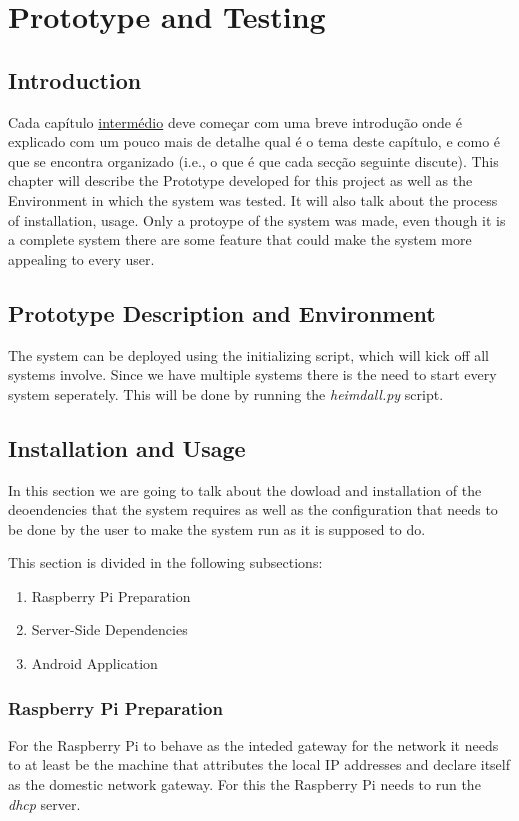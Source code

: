 \chapter{Prototype and Testing}
\label{chap:proto-test}

\section{Introduction}
\label{chap4:sec:intro}
Cada capítulo \underline{intermédio} deve começar com uma breve introdução onde é explicado com um pouco mais de detalhe qual é o tema deste capítulo, e como é que se encontra organizado (i.e., o que é que cada secção seguinte discute).
This chapter will describe the Prototype developed for this project as well as
the Environment in which the system was tested. It will also talk about the
process of installation, usage. Only a protoype of the system was made, even
though it is a complete system there are some feature that could make the system
more appealing to every user.

\section{Prototype Description and Environment}
\label{chap4:sec:desc-env}
The system can be deployed using the initializing script, which will kick off
all systems involve. Since we have multiple systems there is the need to start
every system seperately. This will be done by running the \emph{heimdall.py}
script.


\section{Installation and Usage}
\label{chap4:sec:inst-usg}
In this section we are going to talk about the dowload and installation of the
deoendencies that the system requires as well as the configuration that needs to
be done by the user to make the system run as it is supposed to do.

This section is divided in the following subsections:
\begin{enumerate}
	\item Raspberry Pi Preparation
	\item Server-Side Dependencies
	\item Android Application
\end{enumerate}

\subsection{Raspberry Pi Preparation}
\label{chap5:sec:inst-usg:sub:rasp-prep}
For the Raspberry Pi to behave as the inteded gateway for the network it needs
to at least be the machine that attributes the local IP addresses and declare
itself as the domestic network gateway. For this the Raspberry Pi needs to run
the \emph{dhcp} server.


